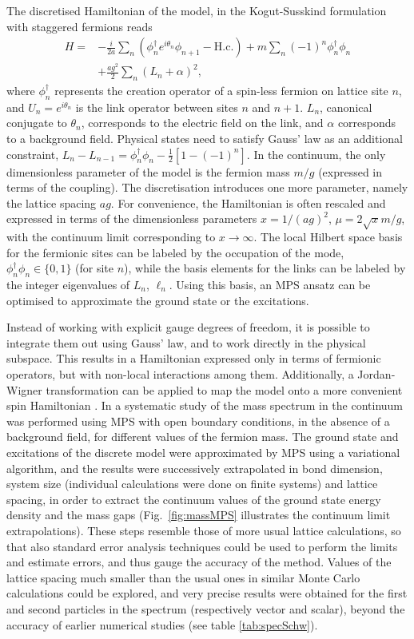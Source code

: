 \documentclass[epj,final]{svjour}
\begin{document}
The discretised Hamiltonian of the model, in the Kogut-Susskind formulation with staggered fermions \cite{Kogut1975} reads
\begin{eqnarray}
H=&-\frac{i}{2 a}\sum_n \left (  \phi^{\dagger}_n e^{i\theta_n}  \phi_{n+1} - \mathrm{H.c.}\right )   
+m\sum_n(-1)^n\phi_n^{\dagger}\phi_n  \nonumber \\
&+\frac{a g^2}{2} \sum_n (L_n+\alpha)^2,
\label{eq:schwinger}
\end{eqnarray}
where $ \phi_{n}^{\dagger}$ represents the creation operator of a spin-less fermion on lattice site $n$, and $U_n=e^{i\theta_n}$ is the link operator between sites $n$ and $n+1$. $L_n$, canonical conjugate to $\theta_n$, corresponds to the electric field on the link, and $\alpha$ corresponds to a background field. Physical states need to satisfy Gauss' law as an additional constraint, $L_n-L_{n-1}=\phi_n^{\dagger}\phi_n-\frac{1}{2}\left [1-(-1)^n\right]$. In the continuum, the only dimensionless parameter of the model is the fermion mass $m/g$ (expressed in terms of the coupling). The discretisation introduces one more parameter, namely the lattice spacing $a g$. For convenience, the Hamiltonian is often rescaled and expressed in terms of the dimensionless parameters $x=1/(a g)^2$, $\mu=2\sqrt{x}m/g$, with the continuum limit corresponding to $x\to \infty$. The local Hilbert space basis for the fermionic sites can be labeled by the occupation of the mode, $\phi^{\dagger}_n \phi_{n} \in\{0,1\}$ (for site $n$), while the basis elements for the links can be labeled by the integer eigenvalues of $L_n$, $\ell_n$. Using this basis, an MPS ansatz can be optimised to approximate the ground state or the excitations.

Instead of working with explicit gauge degrees of freedom, it is possible to integrate them out using Gauss' law, and to work directly in the physical subspace. This results in a Hamiltonian expressed only in terms of fermionic operators, but with non-local interactions among them. Additionally, a Jordan-Wigner transformation can be applied to map the model onto a more convenient spin Hamiltonian \cite{Banks:1975gq}. In \cite{Banuls2013} a systematic study of the mass spectrum in the continuum was performed using MPS with open boundary conditions, in the absence of a background field, for different values of the fermion mass. The ground state and excitations of the discrete model were approximated by MPS using a variational algorithm, and the results were successively extrapolated in bond dimension, system size (individual calculations were done on finite systems) and lattice spacing, in order to extract the continuum values of the ground state energy density and the mass gaps (Fig.~\ref{fig:massMPS} illustrates the continuum limit extrapolations). These steps resemble those of more usual lattice calculations, so that also standard error analysis techniques could be used to perform the limits and estimate errors, and thus gauge the accuracy of the method. Values of the lattice spacing much smaller than the usual ones in similar Monte Carlo calculations could be explored, and very precise results were obtained for the first and second particles in the spectrum (respectively vector and scalar), beyond the accuracy of earlier numerical studies (see table \ref{tab:specSchw}).
\end{document}
